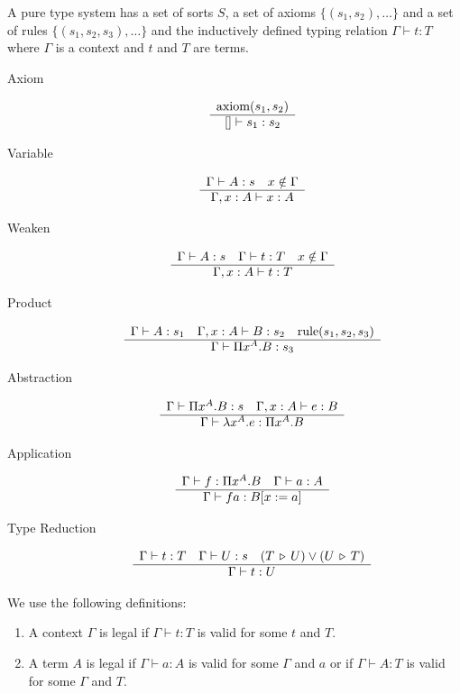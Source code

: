 \begin{definition}
  A pure type system has a set of sorts $S$, a set of axioms
  $\{(s_1,s_2), \ldots\}$ and a set of rules $\{(s_1,s_2,s_3), \ldots \}$ and
  the inductively defined typing relation $\Gamma \vdash t: T$ where $\Gamma$
  is a context and $t$ and $T$ are terms.
  \begin{description}

  \item[Axiom] $$\begin{array}{c}  \text{axiom}(s_1,s_2) \\ \hline [] \vdash s_1:s_2\end{array}$$

  \item[Variable]
    $$\begin{array}{c} \Gamma \vdash A:s\quad x \notin \Gamma \\ \hline \Gamma,x:A \vdash x:A\end{array}$$


  \item[Weaken]
    $$\begin{array}{c} \Gamma \vdash A:s \quad  \Gamma \vdash t:T   \quad x \notin \Gamma \\ \hline \Gamma,x:A \vdash t:T\end{array}$$


  \item[Product]
    $$\begin{array}{c} \Gamma \vdash A:s_1 \quad
      \Gamma,x:A \vdash B:s_2 \quad
      \text{rule}(s_1,s_2,s_3) \\ \hline \Gamma \vdash \Pi x^A . B : s_3\end{array}
    $$

  \item[Abstraction]
    $$\begin{array}{c} \Gamma \vdash \Pi x^A.B: s \quad
      \Gamma,x:A \vdash e:B
     \\ \hline \Gamma \vdash \lambda x^A.e : \Pi x^A . B\end{array}
    $$

  \item[Application]
    $$\begin{array}{c} \Gamma \vdash f: \Pi x^A.B \quad
      \Gamma \vdash a:A
     \\ \hline \Gamma \vdash f a : B[x:=a]\end{array}
    $$

  \item[Type Reduction]
    $$\begin{array}{c} \Gamma \vdash t: T \quad
      \Gamma\vdash U: s \quad
      (T \,\triangleright\, U) \lor (U \,\triangleright\, T)
     \\ \hline \Gamma \vdash t: U\end{array}
    $$
  \end{description}
\end{definition}

We use the following definitions:
\begin{enumerate}

\item A context $\Gamma$ is legal if $\Gamma \vdash t:T$ is valid for some $t$
  and $T$.


\item A term $A$ is legal if $\Gamma \vdash a:A$ is valid for some $\Gamma$
  and $a$ or if $\Gamma\vdash A:T$ is valid for some $\Gamma$ and $T$.
\end{enumerate}





